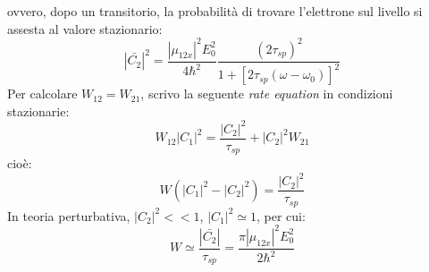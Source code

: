 ovvero, dopo un transitorio, la probabilità di trovare l'elettrone sul livello  si assesta al valore stazionario:
\begin{equation*}
|\bar{C_2}|^2 = \frac{|\mu_{12x}|^2 E_0^2}{4\hbar^2} \frac{(2 \tau_{sp})^2}{1 + [2 \tau_{sp}(\omega - \omega_0)]^2}
\end{equation*}
Per calcolare $W_{12} = W_{21}$, scrivo la seguente \textit{rate equation} in condizioni stazionarie:
\begin{equation*}
W_{12} |C_1|^2 = \frac{|C_2|^2}{\tau_{sp}} + |C_2|^2 W_{21}
\end{equation*}
cioè:
\begin{equation*}
W(|C_1|^2 - |C_2|^2) = \frac{|C_2|^2}{\tau_{sp}}
\end{equation*}
In teoria perturbativa, $|C_2|^2 << 1$, $|C_1|^2 \simeq 1$, per cui:
\begin{equation*}
W \simeq \frac{|\bar{C_2}|}{\tau_{sp}} = \frac{\pi |\mu_{12x}|^2 E_0^2}{2 \hbar^2}
\end{equation*}